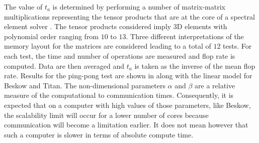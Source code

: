 \documentclass{sig-alternate}
\begin{document}
The value of $t_a$ is determined by performing a number of matrix-matrix multiplications representing the tensor products that are at the core of a spectral element solver \cite{fischer:hom}. The tensor products considered imply 3D elements with polynomial order ranging from $10$ to $13$. Three different interpretations of the memory layout for the matrices are considered leading to a total of $12$ tests. For each test, the time and number of operations are measured and flop rate is computed. Data are then averaged and $t_a$ is taken as the inverse of the mean flop rate. Results for the ping-pong test are shown in  along with the linear model for Beskow and Titan. The non-dimensional parameters $\alpha$ and $\beta$ are a relative measure of the computational to communication times. Consequently, it is expected that on a computer with high values of those parameters, like Beskow, the scalability limit will occur for a lower number of cores because communication will become a limitation earlier. It does not mean however that such a computer is slower in terms of absolute compute time. %
\end{document}
